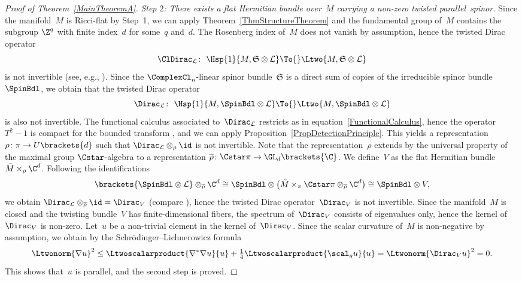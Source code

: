 \documentclass[10pt,a4paper]{amsart}
\numberwithin{equation}{section}
\newcommand{\ClSpinBdl}{\mathfrak{S}}
\newcommand{\ClDL}{\ClDirac_{\mathcal{L}}}
\newcommand{\DL}{\Dirac_{\mathcal{L}}}
\begin{document}
\begin{proof}[Proof of Theorem~\ref{MainTheoremA}]
{\it Step $2$: There exists a flat Hermitian bundle over~$M$ carrying a non-zero twisted parallel~spinor.} %
Since the manifold~$M$ is Ricci-flat by Step~1, we can apply Theorem~\ref{ThmStructureTheorem} and the fundamental group of~$M$ contains the subgroup $\Z^q$ with finite index~$d$ for some~$q$ and~$d$. The Rosenberg index of~$M$ does not vanish by assumption, hence the twisted Dirac operator
\[
\ClDL\colon\ \Hsp{1}{M,\ClSpinBdl\otimes \mathcal{L}} \To{} \Ltwo{M,\ClSpinBdl\otimes \mathcal{L}}
\]
is not invertible (see, e.g., \cite[Lemma 2.4\,(ii)]{Tony2025}). Since the $\ComplexCl_n$-linear spinor bundle~$\ClSpinBdl$ is a direct sum of copies of the irreducible spinor bundle~$\SpinBdl$, we obtain that the twisted Dirac operator
\[
\DL\colon\ \Hsp{1}{M,\SpinBdl\otimes \mathcal{L}} \To{} \Ltwo{M,\SpinBdl\otimes \mathcal{L}}
\]
is also not invertible. The functional calculus associated to~$\DL$ restricts as in equation~\ref{FunctionalCalculus}, hence the operator $T^2-1$ is compact for the bounded transform \smash{$T\coloneqq \DL\brackets{\DL^2+1}^{-1/2}$}, and we can apply Proposition~\ref{PropDetectionPrinciple}. This yields a representation $\rho\colon \pi\to U\brackets{d}$ such that $\DL\otimes_{\rho} \id$ is not invertible. Note that the representation~$\rho$ extends by the universal property of the maximal group $\Cstar$-algebra to a representation $\overline{\rho}\colon \Cstar \pi \to \GL_d\brackets{\C}$. We define~$V$ as the flat Hermitian bundle $\tilde{M}\times_{\rho} \C ^d$. Following the identifications
\[
\brackets{\SpinBdl\otimes \mathcal{L}} \otimes_{\overline{\rho}} \C^d\cong\SpinBdl\otimes
\bigl(\tilde{M} \times_{\pi} \Cstar \pi \otimes_{\overline{\rho}} \C^d\bigr) \cong \SpinBdl \otimes V,
\]
we obtain $\DL\otimes_{\overline{\rho}} \id=\Dirac_V$ (compare \cite[Proposition~3.1]{Schick2021a}), hence the twisted Dirac operator~$\Dirac_V$ is not invertible. Since the manifold~$M$ is closed and the twisting bundle~$V$ has finite-dimensional fibers, the spectrum of~$\Dirac_V$ consists of eigenvalues only, hence the kernel of $\Dirac_V$ is non-zero. Let~$u$ be a non-trivial element in the kernel of~$\Dirac_V$. Since the scalar curvature of~$M$ is non-negative by assumption, we obtain by the Schr\"odinger--Lichnerowicz formula
\[
 \Ltwonorm{\nabla u}^2\leq \Ltwoscalarproduct{\nabla^*\nabla u}{u}+\tfrac{1}{4}\Ltwoscalarproduct{\scal_g u}{u}= \Ltwonorm{\Dirac_V u}^2=0.
\]
This shows that~$u$ is parallel, and the second step is proved.


\end{proof}
\end{document}
